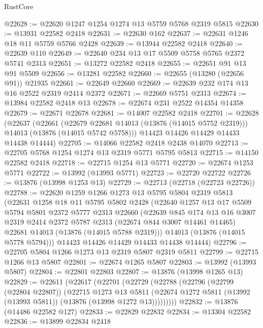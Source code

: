 \begin{lexlean}{RustCore}
\begin{coremodule}
@22628 := @22620 @1247 @1254 @1274 @13 @5759 @5768 @2319 @5815
@22630 := @13931 @22582 @2418
@22631 := @22630 @162
@22637 := @22631 @1246 @18 @11 @5759 @5766 @2428
@22639 := @13944 @22582 @2418
@22640 := @22639 @110
@22649 := @22640 @234 @13 @17 @5509 @5758 @5765 @2372 @5741 @2313
@22651 := @13272 @22582 @2418
@22655 := @22651 @91 @13 @91 @5509
@22656 := @13281 @22582
@22660 := @22655 (@13280 (@22656 @91)) @21935
@22661 := @22649 @22660
@22669 := @22639 @232 @174 @13 @16 @2522 @2319 @2414 @2372
@22671 := @22669 @5751 @2313
@22674 := @13984 @22582 @2418 @13
@22678 := @22674 @231 @2522 @14354 @14358
@22679 := @22671 @22678
@22681 := @14007 @22582 @2418
@22701 := @22628
    (@22637
      (@22661
        (@22679 @22681 @14013 (@13876 (@14015 @5752 @2319)))
        @14013
        (@13876 (@14015 @5742 @5758)))
      @14423
      @14426
      @14429
      @14433
      @14438
      @14444)
@22705 := @14066 @22582 @2418 @2438 @14070
@22713 := @22705 @5768 @1254 @1274 @13 @2319 @5771 @5795 @5813
@22715 := @14150 @22582 @2418
@22718 := @22715 @1254 @13 @5771
@22720 := @22674 @1253 @5771
@22722 := @13992 (@13993 @5771)
@22723 := @22720 @22722
@22726 := @13876 (@13998 @1253 @13)
@22729 := @22713 (@22718 (@22723 @22726))
@22788 := @22620
    @1259
    @1266
    @1273
    @13
    @5795
    @5804
    @2319
    @5813
    (@22631
      @1258
      @18
      @11
      @5795
      @5802
      @2428
      (@22640
        @1257
        @13
        @17
        @5509
        @5794
        @5801
        @2372
        @5777
        @2313
        @22660
        (@22639
          @845
          @174
          @13
          @16
          @3007
          @2319
          @2414
          @2372
          @5787
          @2313
          (@22674 @844 @3007 @14461 @14465)
          @22681
          @14013
          (@13876 (@14015 @5788 @2319)))
        @14013
        (@13876 (@14015 @5778 @5794)))
      @14423
      @14426
      @14429
      @14433
      @14438
      @14444)
@22796 := @22705 @5804 @1266 @1273 @13 @2319 @5807 @2319 @5811
@22799 := @22715 @1266 @13 @5807
@22801 := @22674 @1265 @5807
@22803 := @13992 (@13993 @5807)
@22804 := @22801 @22803
@22807 := @13876 (@13998 @1265 @13)
@22829 := @22611
    (@22617
      (@22701
        (@22729
          (@22788
            (@22796
              (@22799 (@22804 @22807))
              (@22715
                @1273
                @13
                @5811
                (@22674 @1272 @5811 (@13992 (@13993 @5811)) (@13876 (@13998 @1272 @13)))))))))
@22832 := @13876 (@14486 @22582 @127)
@22833 := @22829 @22832
@22834 := @13304 @22582
@22836 := @13899 @22834 @2418

\end{coremodule}
\end{lexlean}
